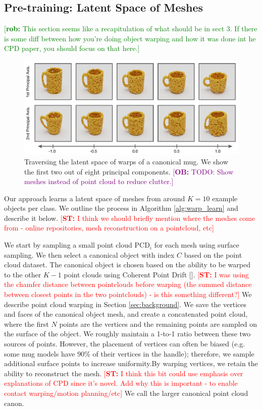 \documentclass{article}
\newcommand{\ob}[1]{\textcolor{purple}{[\textbf{OB:} #1]}}
\newcommand{\rob}[1]{\textcolor{green}{[\textbf{rob:} #1]}}
\newcommand{\rst}
[1]{\textcolor{red}
{[\textbf{ST:} #1]}}
\begin{document}
\subsection{Pre-training: Latent Space of Meshes}
\label{sec:methods:mesh}
\rob{This section seems like a recapitulation of what should be in sect 3. If there is some diff between how you're doing object warping and how it was done int he CPD paper, you should focus on that here.}



\begin{figure}
    \centering
    \includegraphics[width=\textwidth]{figures/latent_mugs2.pdf}
    \caption{Traversing the latent space of warps of a canonical mug. We show the first two out of eight principal components. \ob{TODO: Show meshes instead of point cloud to reduce clutter.}}
    \label{fig:latent}
\end{figure}

Our approach learns a latent space of meshes from around $K=10$ example objects per class. We outline the process in Algorithm \ref{alg:warp_learn} and describe it below. \rst{I think we should briefly mention where the meshes come from - online repositories, mesh reconstruction on a pointcloud, etc}

We start by sampling a small point cloud $\mathrm{PCD}_i$ for each mesh using surface sampling. We then select a canonical object with index $C$ based on the point cloud dataset. The canonical object is chosen based on the ability to be warped to the other $K-1$ point clouds using Coherent Point Drift []. \rst{I was using the chamfer distance between pointclouds before warping (the summed distance between closest points in the two pointclouds) - is this something different?} We describe point cloud warping in Section \ref{sec:background}. We save the vertices and faces of the canonical object mesh, and create a concatenated point cloud, where the first $N$ points are the vertices and the remaining points are sampled on the surface of the object. We roughly maintain a 1-to-1 ratio between these two sources of points.  However, the placement of vertices can often be biased (e.g. some mug models have 90\% of their vertices in the handle); therefore, we sample additional surface points to increase uniformity.By warping vertices, we retain the ability to reconstruct the mesh. \rst{I think this bit could use emphasis over explanations of CPD since it's novel. Add why this is important - to enable contact warping/motion planning/etc}  We call the larger canonical point cloud $\mathrm{canon}$. 
\end{document}
